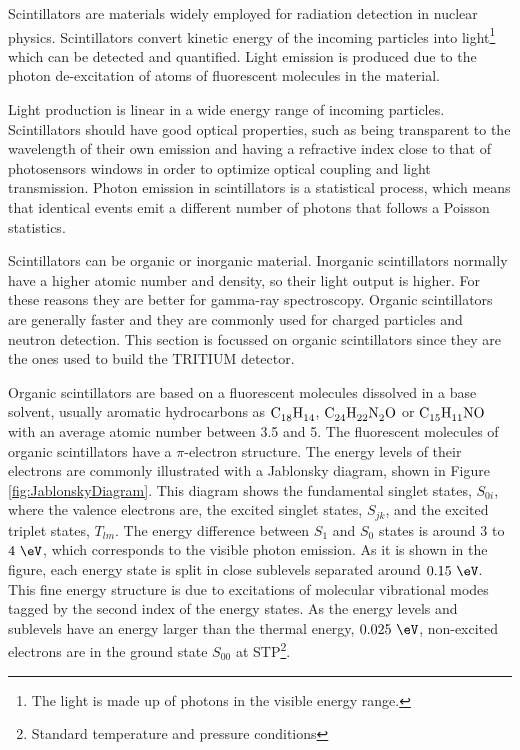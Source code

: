Scintillators are materials widely employed for radiation detection in nuclear physics. Scintillators convert kinetic energy of the incoming particles into light\footnote{The light is made up of photons in the visible energy range.} which can be detected and quantified. Light emission is produced due to the photon de-excitation of atoms of fluorescent molecules in the material.

Light production is linear in a wide energy range of incoming particles. Scintillators should have good optical properties, such as being transparent to the wavelength of their own emission and having a refractive index close to that of photosensors windows in order to optimize optical coupling and light transmission. Photon emission in scintillators is a statistical process, which means that identical events emit a different number of photons that follows a Poisson statistics.

Scintillators can be organic or inorganic material. Inorganic scintillators normally have a higher atomic number and density, so their light output is higher. For these reasons they are better for gamma-ray spectroscopy. Organic scintillators are generally faster and they are commonly used for charged particles and neutron detection. This section is focussed on organic scintillators since they are the ones used to build the TRITIUM detector. 

Organic scintillators are based on a fluorescent molecules dissolved in a base solvent, usually aromatic hydrocarbons as $\ce{C_{18}H_{14}}$, $\ce{C_{24}H_{22}N_{2}O}$ or $\ce{C_{15}H_{11}NO}$ with an average atomic number between 3.5 and 5. The fluorescent molecules of organic scintillators have a $\pi$-electron structure. The energy levels of their electrons are commonly illustrated with a Jablonsky diagram, shown in Figure \ref{fig:JablonskyDiagram}. This diagram shows the fundamental singlet states, $S_{0i}$, where the valence electrons are, the excited singlet states, $S_{jk}$, and the excited triplet states, $T_{lm}$. The energy difference between $S_1$ and $S_0$ states is around $3$ to $4~\eV$, which corresponds to the visible photon emission. As it is shown in the figure, each energy state is split in close sublevels separated around $0.15~\eV$. This fine energy structure is due to excitations of molecular vibrational modes tagged by the second index of the energy states. As the energy levels and sublevels have an energy larger than the thermal energy, $0.025~\eV$, non-excited electrons are in the ground state $S_{00}$ at STP\footnote{Standard temperature and pressure conditions}.

